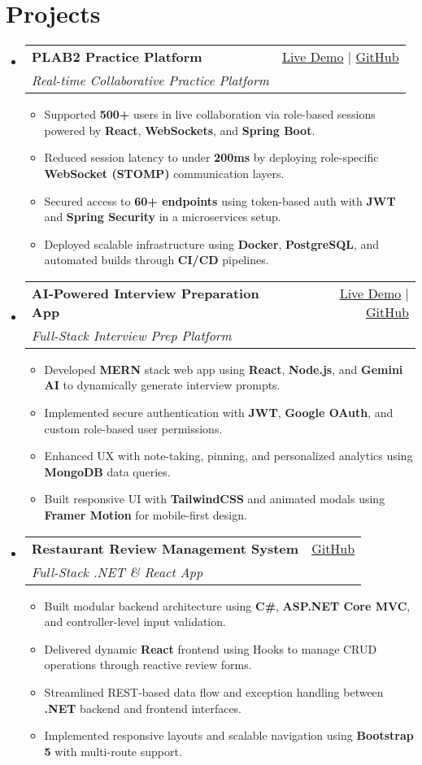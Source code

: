 \documentclass[letterpaper,11pt]{article}
\makeatletter
\newcommand{\resumeItem}[1]{\item\small{#1 \vspace{-2pt}}}
\newcommand{\resumeSubheading}[4]{
  \vspace{-1pt}\item
    \begin{tabular*}{0.97\textwidth}[t]{l@{\extracolsep{\fill}}r}
      \textbf{#1} & #2 \\
      \textit{\small#3} & \textit{\small #4} \\
    \end{tabular*}\vspace{-5pt}
}
\newcommand{\resumeSubHeadingListStart}{\begin{itemize}[leftmargin=*]}
\newcommand{\resumeSubHeadingListEnd}{\end{itemize}}
\newcommand{\resumeItemListStart}{\begin{itemize}}
\newcommand{\resumeItemListEnd}{\end{itemize}\vspace{-5pt}}
\makeatother
\begin{document}
\section{Projects}
  \resumeSubHeadingListStart
    \resumeSubheading
      {\textbf{PLAB2 Practice Platform}}{\href{https://plab2practice.com}{Live Demo} | \href{https://github.com/altansaid/plab2projectnew}{GitHub}}
      {Real-time Collaborative Practice Platform}{}
      \resumeItemListStart
        \resumeItem{Supported \textbf{500+} users in live collaboration via role-based sessions powered by \textbf{React}, \textbf{WebSockets}, and \textbf{Spring Boot}.}
        \resumeItem{Reduced session latency to under \textbf{200ms} by deploying role-specific \textbf{WebSocket (STOMP)} communication layers.}
        \resumeItem{Secured access to \textbf{60+ endpoints} using token-based auth with \textbf{JWT} and \textbf{Spring Security} in a microservices setup.}
        \resumeItem{Deployed scalable infrastructure using \textbf{Docker}, \textbf{PostgreSQL}, and automated builds through \textbf{CI/CD} pipelines.}
      \resumeItemListEnd

    \resumeSubheading
      {\textbf{AI-Powered Interview Preparation App}}{\href{https://interviewcoach-ai.vercel.app}{Live Demo} | \href{https://github.com/altansaid/interviewcoach-ai}{GitHub}}
      {Full-Stack Interview Prep Platform}{}
      \resumeItemListStart
        \resumeItem{Developed \textbf{MERN} stack web app using \textbf{React}, \textbf{Node.js}, and \textbf{Gemini AI} to dynamically generate interview prompts.}
        \resumeItem{Implemented secure authentication with \textbf{JWT}, \textbf{Google OAuth}, and custom role-based user permissions.}
        \resumeItem{Enhanced UX with note-taking, pinning, and personalized analytics using \textbf{MongoDB} data queries.}
        \resumeItem{Built responsive UI with \textbf{TailwindCSS} and animated modals using \textbf{Framer Motion} for mobile-first design.}
      \resumeItemListEnd

    \resumeSubheading
      {\textbf{Restaurant Review Management System}}{\href{https://github.com/altansaid/restaurantreviewmanagementsystem}{GitHub}}{Full-Stack .NET \& React App}{}
      \resumeItemListStart
        \resumeItem{Built modular backend architecture using \textbf{C\#}, \textbf{ASP.NET Core MVC}, and controller-level input validation.}
        \resumeItem{Delivered dynamic \textbf{React} frontend using Hooks to manage CRUD operations through reactive review forms.}
        \resumeItem{Streamlined REST-based data flow and exception handling between \textbf{.NET} backend and frontend interfaces.}
        \resumeItem{Implemented responsive layouts and scalable navigation using \textbf{Bootstrap 5} with multi-route support.}
      \resumeItemListEnd
  \resumeSubHeadingListEnd
\end{document}

